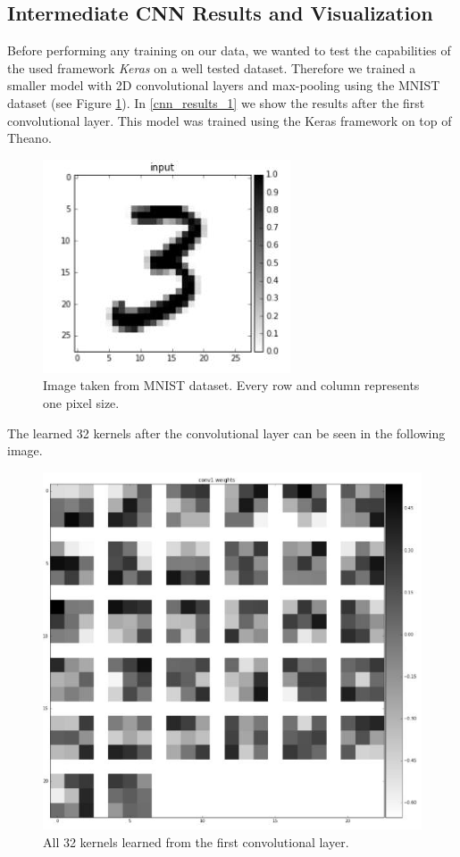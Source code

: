 \documentclass[	DIV=calc,%
				paper=a4,%
				fontsize=11pt,%
				twocolumn]{scrartcl}	 %
\begin{document}
\subsection*{Intermediate CNN Results and Visualization}

Before performing any training on our data, we wanted to test the capabilities of the used framework \textit{Keras} on a well tested dataset. Therefore we trained a smaller model with 2D convolutional layers and max-pooling using the MNIST dataset (see Figure \ref{cnn_results_2}). In \ref{cnn_results_1} we show the results after the first convolutional layer. This model was trained using the Keras framework on top of Theano.

\begin{figure}[H]
    \centering
    \includegraphics[width=0.8\linewidth]{data/cnn_results_2.png}
    \caption{Image taken from MNIST dataset. Every row and column represents one pixel size.}
    \label{cnn_results_2}
\end{figure}

The learned 32 kernels after the convolutional layer can be seen in the following image. 

\begin{figure}[H]
    \centering
    \includegraphics[width=0.8\linewidth]{data/cnn_results_3.png}
    \caption{All 32 kernels learned from the first convolutional layer.}
    \label{cnn_results_3}
\end{figure}
\end{document}
